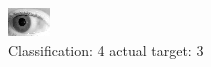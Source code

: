 \begin{figure}[h!]
\begin{center}
\includegraphics[width=0.60\columnwidth]{figures/ID331_class_4_target_3.png}
\end{center}
\caption{ Classification: 4 actual target: 3}
\label{fig:ID331_class_4_target_3}
\end{figure}
